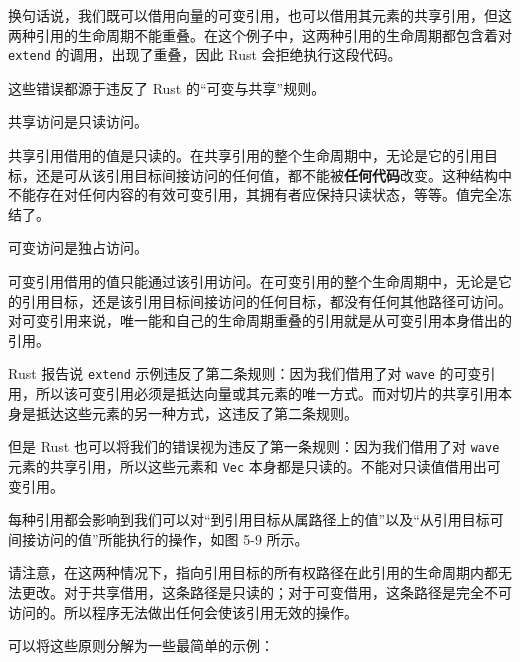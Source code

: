 换句话说，我们既可以借用向量的可变引用，也可以借用其元素的共享引用，但这两种引用的生命周期不能重叠。在这个例子中，这两种引用的生命周期都包含着对 \texttt{extend} 的调用，出现了重叠，因此 Rust 会拒绝执行这段代码。

这些错误都源于违反了 Rust 的“可变与共享”规则。

\begin{mySidenote}
共享访问是只读访问。
\end{mySidenote}

共享引用借用的值是只读的。在共享引用的整个生命周期中，无论是它的引用目标，还是可从该引用目标间接访问的任何值，都不能被\textbf{任何代码}改变。这种结构中不能存在对任何内容的有效可变引用，其拥有者应保持只读状态，等等。值完全冻结了。

\begin{mySidenote}
可变访问是独占访问。
\end{mySidenote}

可变引用借用的值只能通过该引用访问。在可变引用的整个生命周期中，无论是它的引用目标，还是该引用目标间接访问的任何目标，都没有任何其他路径可访问。对可变引用来说，唯一能和自己的生命周期重叠的引用就是从可变引用本身借出的引用。

Rust 报告说 \texttt{extend} 示例违反了第二条规则：因为我们借用了对 \texttt{wave} 的可变引用，所以该可变引用必须是抵达向量或其元素的唯一方式。而对切片的共享引用本身是抵达这些元素的另一种方式，这违反了第二条规则。

但是 Rust 也可以将我们的错误视为违反了第一条规则：因为我们借用了对 \texttt{wave} 元素的共享引用，所以这些元素和 \texttt{Vec} 本身都是只读的。不能对只读值借用出可变引用。

每种引用都会影响到我们可以对“到引用目标从属路径上的值”以及“从引用目标可间接访问的值”所能执行的操作，如图 5-9 所示。


请注意，在这两种情况下，指向引用目标的所有权路径在此引用的生命周期内都无法更改。对于共享借用，这条路径是只读的；对于可变借用，这条路径是完全不可访问的。所以程序无法做出任何会使该引用无效的操作。

可以将这些原则分解为一些最简单的示例：

